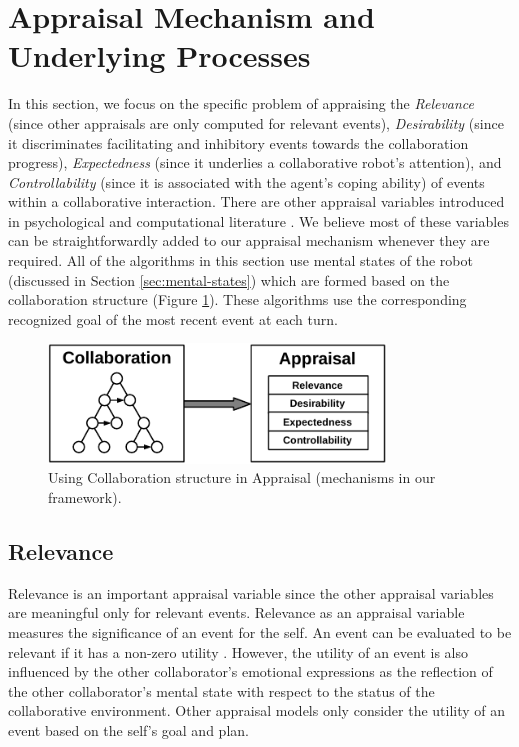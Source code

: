\documentclass[12pt]{report}
\begin{document}
\section{Appraisal Mechanism and Underlying Processes}
\label{sec:appraisal}
In this section, we focus on the specific problem of appraising the
\textit{Relevance} (since other appraisals are only computed for relevant
events), \textit{Desirability} (since it discriminates facilitating and
inhibitory events towards the collaboration progress), \textit{Expectedness}
(since it underlies a collaborative robot's attention), and
\textit{Controllability} (since it is associated with the agent's coping
ability) of events within a collaborative interaction. There are other appraisal
variables introduced in psychological \cite{scherer:appraisal-processes} and
computational literature \cite{gratch:domain-independent}. We believe most of
these variables can be straightforwardly added to our appraisal mechanism
whenever they are required. All of the algorithms in this section use mental
states of the robot (discussed in Section \ref{sec:mental-states}) which are
formed based on the collaboration structure (Figure
\ref{fig:appraisal-collaboration}). These algorithms use the corresponding
recognized goal of the most recent event at each turn.

\begin{figure}[tbh]
  \centering
  \includegraphics[width=0.8\textwidth]{figure/appraisal-collaboration-croped.pdf}
  \caption{Using Collaboration structure in Appraisal (mechanisms in our
  framework).}
  \label{fig:appraisal-collaboration}
\end{figure}

\subsection{Relevance}
Relevance is an important appraisal variable since the other appraisal variables
are meaningful only for relevant events. Relevance as an appraisal variable
measures the significance of an event for the self. An event can be evaluated to
be relevant if it has a non-zero utility \cite{marsella:ema-process-model}.
However, the utility of an event is also influenced by the other collaborator's
emotional expressions as the reflection of the other collaborator's mental state
with respect to the status of the collaborative environment. Other appraisal
models only consider the utility of an event based on the self's goal and plan.
\end{document}
